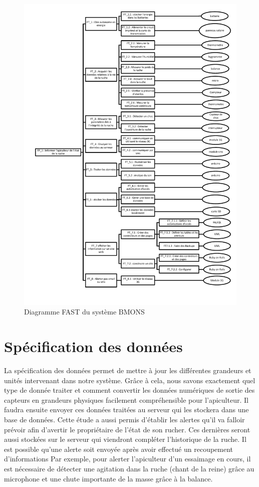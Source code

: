 \begin{figure}[h!]
\centering\includegraphics[scale=0.8]{FAST_BMONS.pdf}
\caption{\label{fig:fast} Diagramme FAST du système BMONS}
\end{figure}

\clearpage

\section{Spécification des données}
\vspace{1.5cm}
La spécification des données permet de mettre à jour les différentes grandeurs 
et unités intervenant dans notre système. Grâce à cela, nous savons exactement 
quel type de donnée traiter et comment convertir les données numériques de sortie des capteurs en grandeurs physiques facilement compréhensible pour l'apiculteur. Il faudra ensuite envoyer ces données traitées au serveur qui les stockera dans une base de données. Cette étude a aussi permis d'établir les alertes qu'il va falloir prévoir afin d'avertir le propriétaire de l'état de son rucher. Ces dernières seront aussi stockées sur le serveur qui viendront compléter l'historique de la ruche. Il est possible qu'une alerte soit envoyée après avoir effectué un recoupement d'informations Par exemple, pour alerter l'apiculteur d'un essaimage en cours, il est nécessaire de détecter une agitation dans la ruche (chant de la reine) grâce au microphone et une chute importante de la masse grâce à la balance. 

